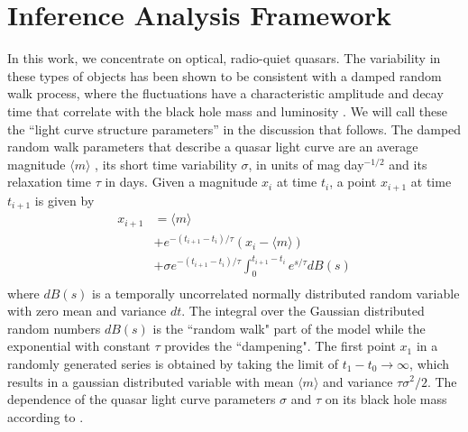 \documentclass{emulateapj}
\begin{document}
\section{Inference Analysis Framework}\label{sec:tdanalysis}

In this work, we concentrate on optical, radio-quiet quasars. The
variability in these types of objects has been shown to be consistent
with a damped random walk process, where the fluctuations have a
characteristic amplitude and decay time that correlate with the black
hole mass and luminosity \citep{Kelly2009a}.  We will call these the
``light curve structure parameters'' in the discussion that
follows. 
The damped random walk parameters that describe a quasar light 
curve are an average magnitude $\langle m \rangle$ , its short time variability $\sigma$, in units of mag day$^{-1/2}$
and its relaxation time $\tau$ in days. Given a magnitude $x_i$ at time $t_i$, a point $x_{i+1}$ at time $t_{i+1}$ is given by
\begin{equation}
\begin{split}
x_{i+1}&  =  \langle m \rangle  \\
&+ e^{-(t_{i+1}-t_i)/\tau}\left(x_{i}-\langle m \rangle\right)\\
&+ \sigma e^{-(t_{i+1}-t_i)/\tau}\int_{0}^{t_{i+1}-t_{i}}e^{s/\tau}dB(s)\\
\end{split}
\label{eq:generative}
\end{equation} 
where $dB(s)$ is a temporally uncorrelated normally distributed random variable with zero mean and variance $dt$. The integral over
the Gaussian distributed random numbers $dB(s)$ is the ``random walk" part of the model while the exponential with constant $\tau$ provides
the ``dampening".
The first point $x_1$ in a randomly generated series is obtained by taking the limit of
$t_1-t_0\to\infty$, which results in a gaussian distributed variable with mean $\langle m \rangle$ and variance $\tau\sigma^2/2$.
The dependence of the quasar light curve parameters $\sigma$ and $\tau$ on its black hole mass according to \citep{Kelly2009a}.

\end{document}
